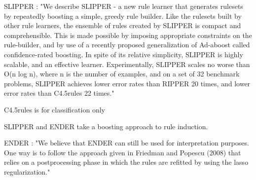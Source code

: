 \documentclass[nobf,doc]{apa}
\begin{document}
SLIPPER \cite{CoheySing99}: "We describe SLIPPER - a new rule learner that generates rulesets by repeatedly boosting a simple, greedy rule builder. Like the rulesets built by other rule learners, the ensemble of rules created by SLIPPER is compact and comprehensible. This is made possible by imposing appropriate constraints on the rule-builder, and by use of a recently proposed generalization of Ad-aboost called confidence-rated boosting. In spite of its relative simplicity, SLIPPER is highly scalable, and an effective learner. Experimentally, SLIPPER scales no worse than O(n log n), where n is the number of examples, and on a set of 32 benchmark problems, SLIPPER achieves lower error rates than RIPPER 20 times, and lower error rates than C4.5rules 22 times."

\cite{Quin14} C4.5rules is for classification only

SLIPPER and ENDER take a boosting approach to rule induction. 

ENDER \cite{DembyKotl10}: "We believe that ENDER can still be used for interpretation purposes. One way is to follow the approach given in Friedman and Popescu (2008) that relies on a postprocessing phase in which the rules are refitted by using the lasso regularization."

 
 






\end{document}
